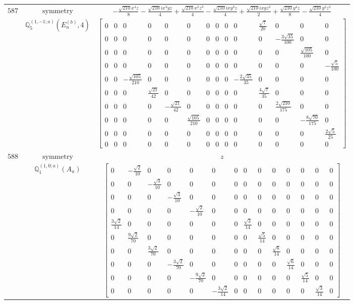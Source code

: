 \documentclass[fleqn,8pt,landscape]{jsarticle}
\begin{document}
\begin{longtable}{ccc}
$ 587 $ & $ \text{symmetry} $ & $ - \frac{\sqrt{210} x^{4} z}{8} - \frac{\sqrt{210} i x^{3} y z}{4} + \frac{\sqrt{210} x^{2} z^{3}}{4} - \frac{\sqrt{210} i x y^{3} z}{4} + \frac{\sqrt{210} i x y z^{3}}{2} + \frac{\sqrt{210} y^{4} z}{8} - \frac{\sqrt{210} y^{2} z^{3}}{4} $ \\
$  $ & $ \mathbb{Q}_{5}^{(1,-1;a)}(E_{u}^{(b)},4) $ & $ \begin{bmatrix} 0 & 0 & 0 & 0 & 0 & 0 & 0 & 0 & 0 & 0 & \frac{\sqrt{7}}{20} & 0 & 0 & 0 \\ 0 & 0 & 0 & 0 & 0 & 0 & 0 & 0 & 0 & 0 & 0 & - \frac{3 \sqrt{35}}{100} & 0 & 0 \\ 0 & 0 & 0 & 0 & 0 & 0 & 0 & 0 & 0 & 0 & 0 & 0 & \frac{\sqrt{105}}{100} & 0 \\ 0 & 0 & 0 & 0 & 0 & 0 & 0 & 0 & 0 & 0 & 0 & 0 & 0 & - \frac{\sqrt{5}}{100} \\ 0 & 0 & - \frac{\sqrt{105}}{210} & 0 & 0 & 0 & 0 & 0 & 0 & - \frac{2 \sqrt{35}}{35} & 0 & 0 & 0 & 0 \\ 0 & 0 & 0 & \frac{\sqrt{21}}{42} & 0 & 0 & 0 & 0 & 0 & 0 & \frac{4 \sqrt{7}}{35} & 0 & 0 & 0 \\ 0 & 0 & 0 & 0 & - \frac{\sqrt{21}}{42} & 0 & 0 & 0 & 0 & 0 & 0 & \frac{2 \sqrt{210}}{175} & 0 & 0 \\ 0 & 0 & 0 & 0 & 0 & \frac{\sqrt{105}}{210} & 0 & 0 & 0 & 0 & 0 & 0 & - \frac{8 \sqrt{70}}{175} & 0 \\ 0 & 0 & 0 & 0 & 0 & 0 & 0 & 0 & 0 & 0 & 0 & 0 & 0 & \frac{2 \sqrt{5}}{25} \\ 0 & 0 & 0 & 0 & 0 & 0 & 0 & 0 & 0 & 0 & 0 & 0 & 0 & 0 \end{bmatrix} $ \\ \hline
$ 588 $ & $ \text{symmetry} $ & $ z $ \\
$  $ & $ \mathbb{Q}_{1}^{(1,0;a)}(A_{u}) $ & $ \begin{bmatrix} 0 & - \frac{\sqrt{2}}{10} & 0 & 0 & 0 & 0 & 0 & 0 & 0 & 0 & 0 & 0 & 0 & 0 \\ 0 & 0 & - \frac{\sqrt{3}}{10} & 0 & 0 & 0 & 0 & 0 & 0 & 0 & 0 & 0 & 0 & 0 \\ 0 & 0 & 0 & - \frac{\sqrt{3}}{10} & 0 & 0 & 0 & 0 & 0 & 0 & 0 & 0 & 0 & 0 \\ 0 & 0 & 0 & 0 & - \frac{\sqrt{2}}{10} & 0 & 0 & 0 & 0 & 0 & 0 & 0 & 0 & 0 \\ \frac{3 \sqrt{2}}{14} & 0 & 0 & 0 & 0 & 0 & 0 & \frac{\sqrt{3}}{14} & 0 & 0 & 0 & 0 & 0 & 0 \\ 0 & \frac{9 \sqrt{2}}{70} & 0 & 0 & 0 & 0 & 0 & 0 & \frac{\sqrt{5}}{14} & 0 & 0 & 0 & 0 & 0 \\ 0 & 0 & \frac{3 \sqrt{2}}{70} & 0 & 0 & 0 & 0 & 0 & 0 & \frac{\sqrt{6}}{14} & 0 & 0 & 0 & 0 \\ 0 & 0 & 0 & - \frac{3 \sqrt{2}}{70} & 0 & 0 & 0 & 0 & 0 & 0 & \frac{\sqrt{6}}{14} & 0 & 0 & 0 \\ 0 & 0 & 0 & 0 & - \frac{9 \sqrt{2}}{70} & 0 & 0 & 0 & 0 & 0 & 0 & \frac{\sqrt{5}}{14} & 0 & 0 \\ 0 & 0 & 0 & 0 & 0 & - \frac{3 \sqrt{2}}{14} & 0 & 0 & 0 & 0 & 0 & 0 & \frac{\sqrt{3}}{14} & 0 \end{bmatrix} $ \\ \hline

\end{longtable}
\end{document}
